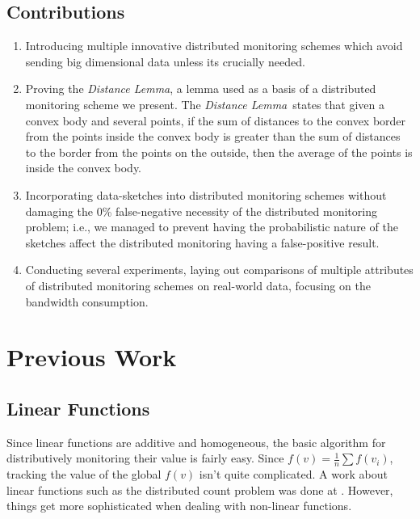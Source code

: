 \documentclass[10pt, conference]{IEEEtran}
\newcommand{\distanceLemma}{\textit{Distance Lemma}}
\begin{document}
\subsection{Contributions}
\begin{enumerate}
\item Introducing multiple innovative distributed monitoring schemes which avoid sending big dimensional data unless its crucially needed.
\item Proving the \distanceLemma , a lemma used as a basis of a distributed monitoring scheme we present. The \distanceLemma \ states that given a convex body and several points, if the sum of distances to the convex border from the points inside the convex body is greater than the sum of distances to the border from the points on the outside, then the average of the points is inside the convex body.
\item Incorporating data-sketches into distributed monitoring schemes without damaging the 0\% false-negative necessity of the distributed monitoring problem; i.e., we managed to prevent having the probabilistic nature of the sketches affect the distributed monitoring having a false-positive result.
\item Conducting several experiments, laying out comparisons of multiple attributes of distributed monitoring schemes on real-world data, focusing on the bandwidth consumption.
\end{enumerate}

\section{Previous Work}
\subsection{Linear Functions}
Since linear functions are additive and homogeneous, the basic algorithm for distributively monitoring their value is fairly easy. Since ${f(v) = \frac{1}{n}\sum f(v_i)}$, tracking the value of the global $f(v)$ isn't quite complicated. A work about linear functions such as the distributed count problem was done at \cite{keralapura2006communication}. However, things get more sophisticated when dealing with non-linear functions.
\end{document}
